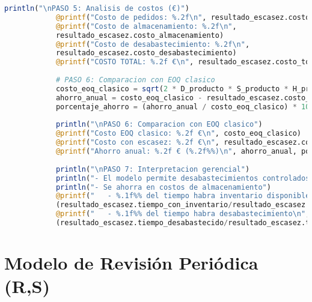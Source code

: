 \documentclass[12pt,a4paper]{book}
\begin{document}
\begin{tcolorbox}[enhanced,colback=azulclaro,colframe=azulprincipal,boxrule=2pt,arc=8pt,
		title={\bfseries\color{white} \faCode\ SOLUCI\'ON DETALLADA},breakable]
\begin{lstlisting}[language=Julia,basicstyle=\footnotesize\ttfamily]
			println("\nPASO 5: Analisis de costos (€)")
			@printf("Costo de pedidos: %.2f\n", resultado_escasez.costo_pedidos)
			@printf("Costo de almacenamiento: %.2f\n", 
			resultado_escasez.costo_almacenamiento)
			@printf("Costo de desabastecimiento: %.2f\n", 
			resultado_escasez.costo_desabastecimiento)
			@printf("COSTO TOTAL: %.2f €\n", resultado_escasez.costo_total)
			
			# PASO 6: Comparacion con EOQ clasico
			costo_eoq_clasico = sqrt(2 * D_producto * S_producto * H_producto)
			ahorro_anual = costo_eoq_clasico - resultado_escasez.costo_total
			porcentaje_ahorro = (ahorro_anual / costo_eoq_clasico) * 100
			
			println("\nPASO 6: Comparacion con EOQ clasico")
			@printf("Costo EOQ clasico: %.2f €\n", costo_eoq_clasico)
			@printf("Costo con escasez: %.2f €\n", resultado_escasez.costo_total)
			@printf("Ahorro anual: %.2f € (%.2f%%)\n", ahorro_anual, porcentaje_ahorro)
			
			println("\nPASO 7: Interpretacion gerencial")
			println("- El modelo permite desabastecimientos controlados")
			println("- Se ahorra en costos de almacenamiento")
			@printf("   - %.1f%% del tiempo habra inventario disponible\n", 
			(resultado_escasez.tiempo_con_inventario/resultado_escasez.tiempo_ciclo)*100)
			@printf("   - %.1f%% del tiempo habra desabastecimiento\n",
			(resultado_escasez.tiempo_desabastecido/resultado_escasez.tiempo_ciclo)*100)
		\end{lstlisting}
		
	\end{tcolorbox}
	
	\section{Modelo de Revisi\'on Peri\'odica (R,S)}
	
\end{document}
